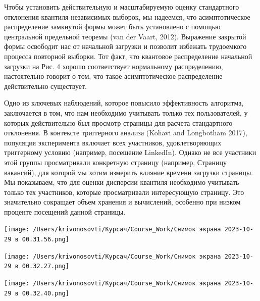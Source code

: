 \documentclass[specialist,
               substylefile = spbu_report.rtx,
               subf,href,colorlinks=true, 12pt]{disser}
\begin{document}
        Чтобы установить действительную и масштабируемую оценку стандартного отклонения квантиля независимых выборок, мы надеемся, 
        что асимптотическое распределение замкнутой формы может быть установлено с помощью центральной предельной теоремы 
        (van der Vaart, 2012). Выражение закрытой формы освободит нас от начальной загрузки и позволит избежать трудоемкого 
        процесса повторной выборки. Тот факт, что квантовое распределение начальной загрузки на Рис. 4 хорошо 
        соответствует нормальному распределению, настоятельно говорит о том, что такое асимптотическое распределение 
        действительно существует.

        Одно из ключевых наблюдений, которое повысило эффективность алгоритма, заключается в том, 
        что нам необходимо учитывать только тех пользователей, у которых действительно был просмотр страницы для расчета 
        стандартного отклонения. В контексте триггерного анализа (Kohavi and Longbotham 2017), популяция эксперимента 
        включает всех участников, удовлетворяющих триггерному условию (например, посещение LinkedIn). Однако не все 
        участники этой группы просматривали конкретную страницу (например, Страницу вакансий), для которой мы хотим 
        измерить влияние времени загрузки страницы. Мы показываем, что для оценки дисперсии квантиля необходимо учитывать 
        только тех участников, которые просматривали интересующую страницу. Это значительно сокращает объем хранения и 
        вычислений, особенно при низком проценте посещений данной страницы.



        \texttt{[image: /Users/krivonosovti/Курсач/Course\_Work/Снимок экрана 2023-10-29 в 00.31.56.png]}

        \texttt{[image: /Users/krivonosovti/Курсач/Course\_Work/Снимок экрана 2023-10-29 в 00.32.27.png]}

        \texttt{[image: /Users/krivonosovti/Курсач/Course\_Work/Снимок экрана 2023-10-29 в 00.32.40.png]}



        
                
\end{document}
